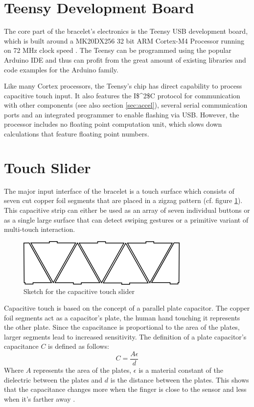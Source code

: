 \section{Teensy Development Board}
The core part of the bracelet's electronics is the Teensy USB development board, which is built around a MK20DX256 32 bit ARM Cortex-M4 Processor running on 72 MHz clock speed \cite{teensy_web}. The Teensy can be programmed using the popular Arduino IDE and thus can profit from the great amount of existing libraries and code examples for the Arduino family.

Like many Cortex processors, the Teensy's chip has direct capability to process capacitive touch input. It also features the \ac{I$^2$C} protocol for communication with other components (see also section \ref{sec:accel}), several serial communication ports and an integrated programmer to enable flashing via \ac{USB}. However, the processor includes no floating point computation unit, which slows down calculations that feature floating point numbers.

\section{Touch Slider}
The major input interface of the bracelet is a touch surface which consists of seven cut copper foil segments that are placed in a zigzag pattern (cf. figure \ref{fig:sketch-touch}). This capacitive strip can either be used as an array of seven individual buttons or as a single large surface that can detect swiping gestures or a primitive variant of multi-touch interaction.

\begin{figure}[bth]
	\myfloatalign
	\begin{center}
	\includegraphics[width=.45\linewidth]{gfx/touch_slider.png}
	\end{center}
	\caption{Sketch for the capacitive touch slider}
	\label{fig:sketch-touch}
\end{figure}

Capacitive touch is based on the concept of a parallel plate capacitor. The copper foil segments act as a capacitor's plate, the human hand touching it represents the other plate. Since the capacitance is proportional to the area of the plates, larger segments lead to increased sensitivity. The definition of a plate capacitor's capacitance $C$ is defined as follows:
\[
	C = \frac{A\epsilon}{d}
\]
Where $A$ represents the area of the plates, $\epsilon$ is a material constant of the dielectric between the plates and $d$ is the distance between the plates. This shows that the capacitance changes more when the finger is close to the sensor and less when it's farther away \cite{Camacho2010}.


